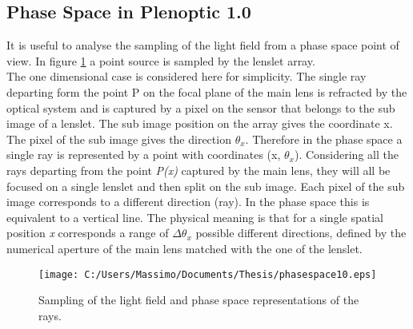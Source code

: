 \subsection{Phase Space in Plenoptic 1.0}
\label{sec:phase_space}
It is useful to analyse the sampling of the light field from a phase space point of view. In figure \ref{fig:plenoptic6} a point source is sampled by the lenslet array.\\
 The one dimensional case is considered here for simplicity. The single ray departing form the point P on the focal plane of the main lens is refracted by the optical system and is captured by a pixel on the sensor that belongs to the sub image of a lenslet. The sub image position on the array gives the coordinate x. The pixel of the sub image gives the direction $\theta_x$. Therefore in the phase space a single ray is represented by a point with coordinates (x, $\theta_x$).
Considering all the rays departing from the point \textit{P(x)} captured by the main lens, they will all be focused on a single lenslet and then split on the sub image. Each pixel of the sub image corresponds to a different direction (ray). In the phase space this is equivalent to a vertical line. The physical meaning is that for a single spatial position \textit{x} corresponds a range of $\Delta \theta_x$ possible different directions, defined by the numerical aperture of the main lens matched with the one of the lenslet.\\
\newpage
\begin{figure}[H]
	\centering
	\texttt{[image: C:/Users/Massimo/Documents/Thesis/phasespace10.eps]}
	\caption{\label{fig:plenoptic6}Sampling of the light field and phase space representations of the rays.  }
\end{figure}
\newpage
